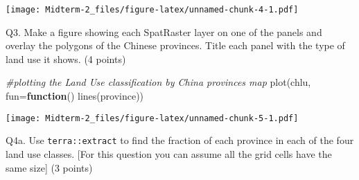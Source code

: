 \documentclass[
]{article}
\newenvironment{Shaded}{\begin{snugshade}}{\end{snugshade}}
\newcommand{\AttributeTok}[1]{\textcolor[rgb]{0.77,0.63,0.00}{#1}}
\newcommand{\CommentTok}[1]{\textcolor[rgb]{0.56,0.35,0.01}{\textit{#1}}}
\newcommand{\ControlFlowTok}[1]{\textcolor[rgb]{0.13,0.29,0.53}{\textbf{#1}}}
\newcommand{\FunctionTok}[1]{\textcolor[rgb]{0.00,0.00,0.00}{#1}}
\newcommand{\NormalTok}[1]{#1}
\newcommand{\OtherTok}[1]{\textcolor[rgb]{0.56,0.35,0.01}{#1}}
\newcommand{\SpecialCharTok}[1]{\textcolor[rgb]{0.00,0.00,0.00}{#1}}
\newcommand{\StringTok}[1]{\textcolor[rgb]{0.31,0.60,0.02}{#1}}
\begin{document}
\texttt{[image: Midterm-2\_files/figure-latex/unnamed-chunk-4-1.pdf]}

Q3. Make a figure showing each SpatRaster layer on one of the panels and
overlay the polygons of the Chinese provinces. Title each panel with the
type of land use it shows. (4 points)

\begin{Shaded}
\begin{Highlighting}[]
\CommentTok{\#plotting the Land Use classification by China provinces map}
\FunctionTok{plot}\NormalTok{(chlu, }\AttributeTok{fun=}\ControlFlowTok{function}\NormalTok{() }\FunctionTok{lines}\NormalTok{(province))}
\end{Highlighting}
\end{Shaded}

\texttt{[image: Midterm-2\_files/figure-latex/unnamed-chunk-5-1.pdf]}

Q4a. Use \texttt{terra::extract} to find the fraction of each province
in each of the four land use classes. {[}For this question you can
assume all the grid cells have the same size{]} (3 points)

\begin{Shaded}
\end{Shaded}
\end{document}
